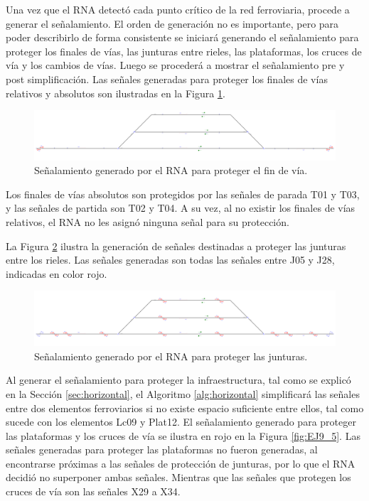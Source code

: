 Una vez que el RNA detectó cada punto crítico de la red ferroviaria, procede a generar el señalamiento. El orden de generación no es importante, pero para poder describirlo de forma consistente se iniciará generando el señalamiento para proteger los finales de vías, las junturas entre rieles, las plataformas, los cruces de vía y los cambios de vías. Luego se procederá a mostrar el señalamiento pre y post simplificación. Las señales generadas para proteger los finales de vías relativos y absolutos son ilustradas en la Figura \ref{fig:EJ9_3}.

\begin{figure}[H]
	\centering
	\includegraphics[width=1\textwidth]{resultados-obtenidos/ejemplo9/images/9_step1.png}
	\centering\caption{Señalamiento generado por el RNA para proteger el fin de vía.}
	\label{fig:EJ9_3}
\end{figure}

Los finales de vías absolutos son protegidos por las señales de parada T01 y T03, y las señales de partida son T02 y T04. A su vez, al no existir los finales de vías relativos, el RNA no les asignó ninguna señal para su protección.

La Figura \ref{fig:EJ9_4} ilustra la generación de señales destinadas a proteger las junturas entre los rieles. Las señales generadas son todas las señales entre J05 y J28, indicadas en color rojo.

\begin{figure}[H]
	\centering
	\includegraphics[width=1\textwidth]{resultados-obtenidos/ejemplo9/images/9_step2.png}
	\centering\caption{Señalamiento generado por el RNA para proteger las junturas.}
	\label{fig:EJ9_4}
\end{figure}

Al generar el señalamiento para proteger la infraestructura, tal como se explicó en la Sección \ref{sec:horizontal}, el Algoritmo \ref{alg:horizontal} simplificará las señales entre dos elementos ferroviarios si no existe espacio suficiente entre ellos, tal como sucede con los elementos Lc09 y Plat12. El señalamiento generado para proteger las plataformas y los cruces de vía se ilustra en rojo en la Figura \ref{fig:EJ9_5}. Las señales generadas para proteger las plataformas no fueron generadas, al encontrarse próximas a las señales de protección de junturas, por lo que el RNA decidió no superponer ambas señales. Mientras que las señales que protegen los cruces de vía son las señales X29 a X34.

